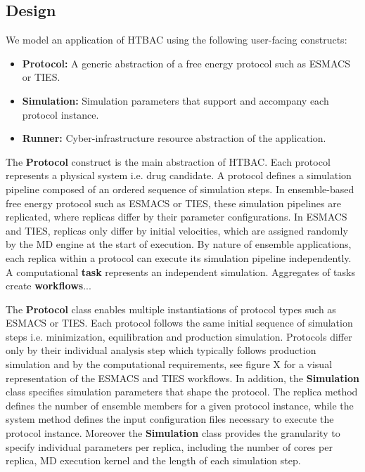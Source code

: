 \subsection{Design}

We model an application of HTBAC using the following user-facing constructs:

\begin{itemize}
  \item \textbf{Protocol:} A generic abstraction of a free energy protocol such
  as ESMACS or TIES. 
  \item \textbf{Simulation:} Simulation parameters that support and accompany 
  each protocol instance. 
  \item \textbf{Runner:} Cyber-infrastructure resource abstraction of the 
  application. 
\end{itemize}

The \textbf{Protocol} construct is the main abstraction of HTBAC. Each protocol
represents a physical system i.e. drug candidate. A protocol defines a
simulation pipeline composed of an ordered sequence of simulation steps. In
ensemble-based free energy protocol such as ESMACS or TIES, these simulation 
pipelines are replicated, where replicas differ by their parameter 
configurations. In ESMACS and TIES, replicas only differ by initial velocities, 
which are assigned randomly by the MD engine at the start of execution. By 
nature of ensemble applications, each replica within a protocol can execute its 
simulation pipeline independently. A computational \textbf{task} represents an 
independent simulation. Aggregates of tasks create \textbf{workflows}... 

The \textbf{Protocol} class enables multiple instantiations of protocol types
such as ESMACS or TIES. Each protocol follows the same initial sequence of 
simulation steps i.e. minimization, equilibration and production simulation.  
Protocols differ only by their individual analysis step which typically follows 
production simulation and by the computational requirements,  
see figure X for a visual representation of the ESMACS and TIES workflows. 
In addition, the \textbf{Simulation} class specifies simulation parameters that
shape the protocol. The replica method defines the number of ensemble members 
for a given protocol instance, while the system method defines the input
configuration files necessary to execute the protocol instance. Moreover the 
\textbf{Simulation} class provides the granularity to specify individual 
parameters per replica, including the number of cores per replica, MD execution 
kernel and the length of each simulation step.

